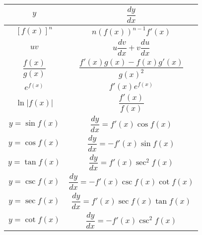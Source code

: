 \documentclass{article}[18pt]
\begin{document}
\begin{center}

\begin{Large}

\begin{tabular}{|c|c|}
 \hline
 $y$&$\dfrac{dy}{dx}$\\
 \hline
 $[f(x)]^n$&$n(f(x))^{n-1}f'(x)$\\
 \hline
 $uv$&$u\dfrac{dv}{dx}+v\dfrac{du}{dx}$\\
 \hline
 $\dfrac{f(x)}{g(x)}$&$\dfrac{f'(x)g(x)-f(x)g'(x)}{g(x)^2}$\\
 \hline
 $e^{f(x)}$&$f'(x)e^{f(x)}$\\
 \hline
 $\ln|f(x)|$&$\dfrac{f'(x)}{f(x)}$\\
 \hline
 $y=\sin f(x)$&$\dfrac{dy}{dx}=f'(x)\cos f(x)$\\
 \hline
 $y=\cos f(x)$&$\dfrac{dy}{dx}=-f'(x)\sin f(x)$\\
 \hline
 $y=\tan f(x)$&$\dfrac{dy}{dx}=f'(x)\sec^2f(x)$\\
 \hline
 $y=\csc f(x)$&$\dfrac{dy}{dx}=-f'(x)\csc f(x)\cot f(x)$\\
 \hline
 $y=\sec f(x)$&$\dfrac{dy}{dx}=f'(x)\sec f(x)\tan f(x)$\\
 \hline
 $y=\cot f(x)$&$\dfrac{dy}{dx}=-f'(x)\csc^2f(x)$\\
 \hline
\end{tabular}
\end{Large}
\end{center}
\end{document}
